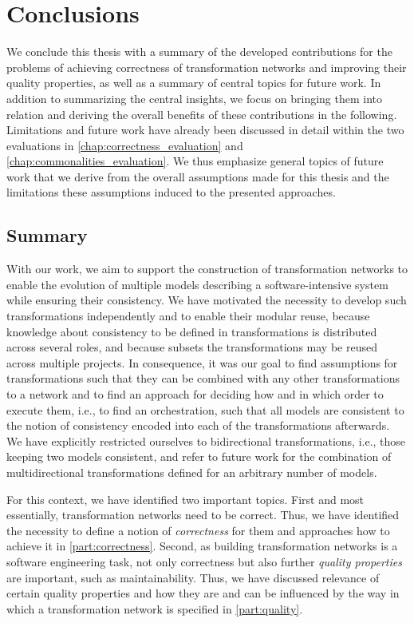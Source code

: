 \chapter{Conclusions
}
\label{chap:conclusions}

We conclude this thesis with a summary of the developed contributions for the problems of achieving correctness of transformation networks and improving their quality properties, as well as a summary of central topics for future work.
In addition to summarizing the central insights, we focus on bringing them into relation and deriving the overall benefits of these contributions in the following.
Limitations and future work have already been discussed in detail %
within the two evaluations in \autoref{chap:correctness_evaluation} and \autoref{chap:commonalities_evaluation}.
We thus emphasize general topics of future work that we derive from the overall assumptions made for this thesis and the limitations these assumptions induced to the presented approaches.


\section{Summary}

With our work, we aim to support the construction of transformation networks to enable the evolution of multiple models describing a software-intensive system while ensuring their consistency.
We have motivated the necessity to develop such transformations independently and to enable their modular reuse, because knowledge about consistency to be defined in transformations is distributed across several roles, and because subsets the transformations may be reused across multiple projects.
In consequence, it was our goal to find assumptions for transformations such that they can be combined with any other transformations to a network and to find an approach for deciding how and in which order to execute them, i.e., to find an orchestration, such that all models are consistent to the notion of consistency encoded into each of the transformations afterwards.
We have explicitly restricted ourselves to bidirectional transformations, i.e., those keeping two models consistent, and refer to future work for the combination of multidirectional transformations defined for an arbitrary number of models.

For this context, we have identified two important topics.
First and most essentially, transformation networks need to be correct.
Thus, we have identified the necessity to define a notion of \emph{correctness} for them and approaches how to achieve it in \autoref{part:correctness}.
Second, as building transformation networks is a software engineering task, not only correctness but also further \emph{quality properties} are important, such as maintainability.
Thus, we have discussed relevance of certain quality properties and how they are and can be influenced by the way in which a transformation network is specified in \autoref{part:quality}.

